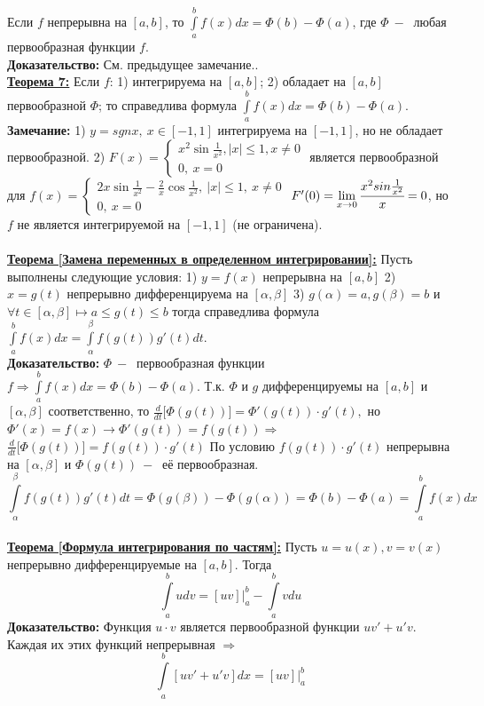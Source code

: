 \documentclass[a4paper,12pt]{article} %
\renewcommand {\leq}{\leqslant}
\begin{document}
	Если $f$ непрерывна на $[a,b]$, то $\int\limits_a^{b} f(x)dx = \Phi(b)-  \Phi(a) $, где $\Phi ~-~$ любая первообразная функции $f$.\\
	\textbf{Доказательство:}
	См. предыдущее замечание..\\
	\underline{\textbf{Теорема 7:}}
	Если $f$:
	1) интегрируема на $[a,b]$;
	2) обладает на $[a,b]$ первообразной $\Phi $;
	то справедлива формула $\int\limits_a^{b} f(x)dx = \Phi(b)-  \Phi(a) $.\\
	\textbf{Замечание:}
	1) $y = sgn x, ~x \in [-1,1]$ интегрируема на $[-1,1]$, но не обладает первообразной.
	2) $F(x)= \begin {cases} x^2 \sin \frac{1}{x^2}, |x|\leq 1, x \neq 0\\ 0, ~x = 0
\end{cases}$ является первообразной для
$f(x) = \begin{cases} 2x \sin\frac{1}{x^2} - \frac{2}{x} \cos\frac{1}{x^2}, ~|x|\leq 1, ~x \neq 0\\ 0, ~x =0
\end{cases}$
$F'(0) =  \lim\limits_{x\rightarrow 0}\cfrac{x^2 sin\frac{1}{x^2}}{x} = 0$, но $f$ не является интегрируемой на $[-1,1]$  (не ограничена).\\\\
\underline{\textbf{Теорема [Замена переменных в определенном интегрировании]:}}
Пусть выполнены следующие условия:
1) $y = f(x)$ непрерывна на $[a,b]$
2) $x = g(t)$ непрерывно дифференцируема на $[\alpha,\beta]$
3) $g(\alpha) = a, g(\beta) = b$ и $\forall t \in [\alpha, \beta] \longmapsto a \leq g(t)\leq b $
тогда справедлива формула $\int\limits_a^b f(x) dx = \int \limits_\alpha^\beta f(g(t))g'(t) dt$.\\
\textbf{Доказательство:}
$\Phi ~-~$ первообразная функции $f\Rightarrow \int\limits_a^b f(x)dx = \Phi(b)- \Phi(a)$.
Т.к. $\Phi$ и $g$ дифференцируемы на $[a,b]$ и $[\alpha, \beta]$ соответственно, то
$\frac{d}{dt}\Big[\Phi(g(t))\Big]= \Phi'(g(t))\cdot g'(t),$ но $\Phi'(x) = f(x) \rightarrow \Phi'(g(t))= f(g(t))\Rightarrow$
$\frac{d}{dt}\Big[\Phi(g(t))\Big]=f(g(t))\cdot g'(t)$
По условию $f(g(t))\cdot g'(t)$ непрерывна на $[\alpha, 
\beta]$ и $\Phi(g(t))~-~$ её первообразная.
$$\int\limits_\alpha^\beta f(g(t))g'(t)dt = \Phi(g(\beta))- \Phi(g(\alpha))= \Phi(b) - \Phi(a) = \int\limits_a^b f(x)dx $$\\
\underline{\textbf{Теорема [Формула интегрирования по частям]:}}
Пусть $u = u(x), v= v(x)$ непрерывно дифференцируемые на $[a,b]$. Тогда $$\int\limits_a^b udv = [uv]|^b_a - \int\limits_a^b vdu$$
\textbf{Доказательство:}
Функция $u \cdot v$ является первообразной функции $uv'+u'v$. Каждая их этих функций непрерывная $\Rightarrow$
$$\int\limits_a^b[uv'+u'v]dx = [uv]|^b_a$$
\newpage
\end{document}
